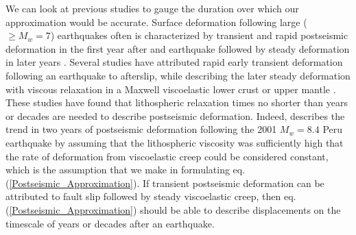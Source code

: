 We can look at previous studies to gauge the duration over which
our approximation would be accurate.  Surface deformation following large
($\geq M_w=7$) earthquakes often is characterized by transient and
rapid postseismic deformation in the first year after and earthquake
followed by steady deformation in later years
\citep[e.g.][]{Savage1997,Savage2005,Ergintav2009}.  Several studies have attributed
rapid early transient deformation following an earthquake to
afterslip, while describing the later steady deformation with viscous
relaxation in a Maxwell viscoelastic lower crust or upper mantle
\citep[e.g.][]{Perfettini2005,Johnson2009,Hearn2009,Freed2006a,Rollins2015}.  These studies have
found that lithospheric relaxation times no shorter than years or
decades are needed to describe postseismic deformation.  Indeed,
\citet{Perfettini2005} describes the trend in two years of postseismic
deformation following the 2001 $M_w=8.4$ Peru earthquake by assuming
that the lithospheric viscosity was sufficiently high that the rate of
deformation from viscoelastic creep could be considered constant,
which is the assumption that we make in formulating
eq. (\ref{Postseismic_Approximation}). If transient postseismic
deformation can be attributed to fault slip followed by steady
viscoelastic creep, then eq. (\ref{Postseismic_Approximation}) should
be able to describe displacements on the timescale of years or decades
after an earthquake.

